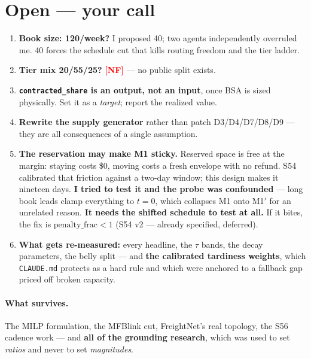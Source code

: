 \documentclass[11pt,a4paper]{article}
\newcommand{\src}[1]{\texttt{\small #1}}
\newcommand{\tagNF}{\textcolor{red}{\textbf{[NF]}}}
\begin{document}
\section{Open --- your call}

\begin{enumerate}[leftmargin=*,itemsep=3pt]
  \item \textbf{Book size: 120/week?} I proposed 40; two agents independently overruled me. 40 forces the
        schedule cut that kills routing freedom and the tier ladder.
  \item \textbf{Tier mix 20/55/25?} \tagNF{} --- no public split exists.
  \item \textbf{\src{contracted\_share} is an output, not an input}, once BSA is sized physically. Set it as
        a \emph{target}; report the realized value.
  \item \textbf{Rewrite the supply generator} rather than patch D3/D4/D7/D8/D9 --- they are all consequences
        of a single assumption.
  \item \textbf{The reservation may make M1 sticky.} Reserved space is free at the margin: staying costs
        \$0, moving costs a fresh envelope with no refund. S54 calibrated that friction against a two-day
        window; this design makes it nineteen days. \textbf{I tried to test it and the probe was
        confounded} --- long book leads clamp everything to $t=0$, which collapses M1 onto M1$'$ for an
        unrelated reason. \textbf{It needs the shifted schedule to test at all.} If it bites, the fix is
        $\text{penalty\_frac} < 1$ (S54 v2 --- already specified, deferred).
  \item \textbf{What gets re-measured:} every headline, the $\tau$ bands, the decay parameters, the belly
        split --- and \textbf{the calibrated tardiness weights}, which \src{CLAUDE.md} protects as a hard
        rule and which were anchored to a fallback gap priced off broken capacity.
\end{enumerate}

\paragraph{What survives.} The MILP formulation, the MFBlink cut, FreightNet's real topology, the S56
cadence work --- and \textbf{all of the grounding research}, which was used to set \emph{ratios} and never
to set \emph{magnitudes}.
\end{document}

